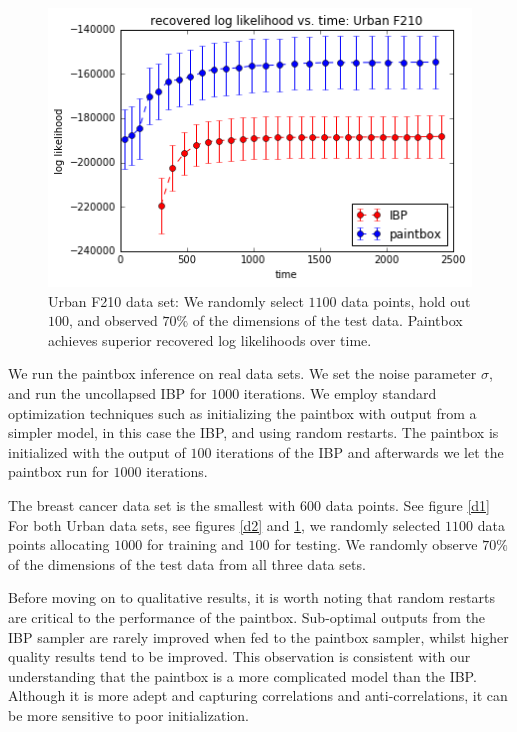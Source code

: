 \documentclass{article}
\begin{document}
\begin{figure}[d3]
\vskip 0.2in
\begin{center}
\centerline{\includegraphics[width=\columnwidth]{d3}}
\caption{Urban F210 data set: We randomly select $1100$ data points, hold out $100$, and observed $70\%$ of the dimensions of the test data.  Paintbox achieves superior recovered log likelihoods over time.}
\label{d3}
\end{center}
\vskip -0.2in
\end{figure} 

We run the paintbox inference on real data sets.  We set the noise parameter $\sigma$, and run the uncollapsed IBP for $1000$ iterations.  We employ standard optimization techniques such as initializing the paintbox with output from a simpler model, in this case the IBP, and using random restarts.  The paintbox is initialized with the output of $100$ iterations of the IBP and afterwards we let the paintbox run for $1000$ iterations.      

The breast cancer data set is the smallest with $600$ data points. See figure \ref{d1}  For both Urban data sets, see figures \ref{d2} and \ref{d3}, we randomly selected $1100$ data points allocating $1000$ for training and $100$ for testing.  We randomly observe $70\%$ of the dimensions of the test data from all three data sets.  

Before moving on to qualitative results, it is worth noting that random restarts are critical to the performance of the paintbox.  Sub-optimal outputs from the IBP sampler are rarely improved when fed to the paintbox sampler, whilst higher quality results tend to be improved.  This observation is consistent with our understanding that the paintbox is a more complicated model than the IBP.  Although it is more adept and capturing correlations and anti-correlations, it can be more sensitive to poor initialization.  
\end{document}
